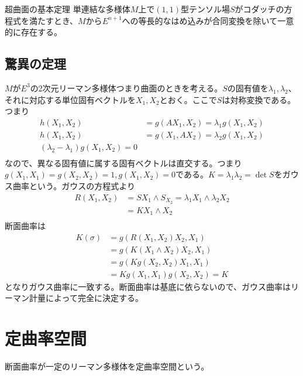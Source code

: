         \begin{thm}{超曲面の基本定理}
            単連結な多様体$M$上で$(1, 1)$型テンソル場$S$がコダッチの方程式を満たすとき、$M$から$E^{n+1}$への等長的なはめ込みが合同変換を除いて一意的に存在する。
        \end{thm}

    \subsection{驚異の定理}

        $M$が$E^3$の2次元リーマン多様体つまり曲面のときを考える。$S$の固有値を$\lambda_1, \lambda_2$、それに対応する単位固有ベクトルを$X_1, X_2$とおく。ここで$S$は対称変換である。つまり
        \begin{align*}
            h(X_1, X_2) &= g(AX_1, X_2) = \lambda_1g(X_1, X_2)\\
            h(X_1, X_2) &= g(X_1, AX_2) = \lambda_2g(X_1, X_2)\\
            (\lambda_2 - \lambda_1)g(X_1, X_2) = 0\\
        \end{align*}
        なので、異なる固有値に属する固有ベクトルは直交する。つまり$g(X_1, X_1) = g(X_2, X_2) = 1, g(X_1, X_2) = 0$である。$K = \lambda_1\lambda_2 = \det S$をガウス曲率という。ガウスの方程式より
        \begin{align*}
            R(X_1, X_2)
            &= SX_1 \wedge S_X_2 = \lambda_1X_1 \wedge \lambda_2X_2\\
            &= KX_1 \wedge X_2\\
        \end{align*}
        断面曲率は
        \begin{align*}
            K(\sigma) &= g(R(X_1, X_2)X_2, X_1)\\
            &= g(K(X_1 \wedge X_2)X_2, X_1)\\
            &= g(Kg(X_2, X_2)X_1, X_1)\\
            &= Kg(X_1, X_1)g(X_2, X_2) = K
        \end{align*}
        となりガウス曲率に一致する。断面曲率は基底に依らないので、ガウス曲率はリーマン計量によって完全に決定する。

\section{定曲率空間}
    断面曲率が一定のリーマン多様体を定曲率空間という。
